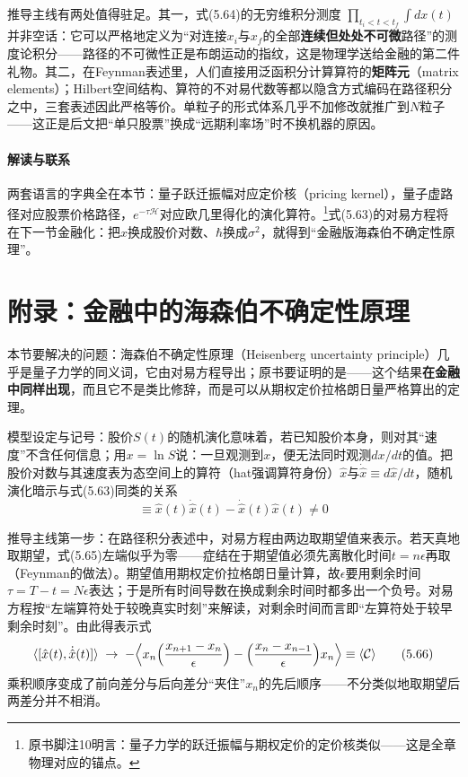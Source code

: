 推导主线有两处值得驻足。其一，式(5.64)的无穷维积分测度
$\prod_{t_i<t<t_f}\int dx(t)$并非空话：它可以严格地定义为“对连接$x_i$与$x_f$的全部\textbf{连续但处处不可微}路径”的测度论积分——路径的不可微性正是布朗运动的指纹，这是物理学送给金融的第二件礼物。其二，在Feynman表述里，人们直接用泛函积分计算算符的\textbf{矩阵元}（matrix elements）；Hilbert空间结构、算符的不对易代数等都以隐含方式编码在路径积分之中，三套表述因此严格等价。单粒子的形式体系几乎不加修改就推广到$N$粒子——这正是后文把“单只股票”换成“远期利率场”时不换机器的原因。

\paragraph{解读与联系}
两套语言的字典全在本节：量子跃迁振幅对应定价核（pricing kernel），量子虚路径对应股票价格路径，$e^{-\tau\mathcal{H}}$对应欧几里得化的演化算符。\footnote{原书脚注10明言：量子力学的跃迁振幅与期权定价的定价核类似——这是全章物理对应的锚点。}式(5.63)的对易方程将在下一节金融化：把$x$换成股价对数、$\hbar$换成$\sigma^2$，就得到“金融版海森伯不确定性原理”。

\section{附录：金融中的海森伯不确定性原理}

本节要解决的问题：海森伯不确定性原理（Heisenberg uncertainty principle）几乎是量子力学的同义词，它由对易方程导出；原书要证明的是——这个结果\textbf{在金融中同样出现}，而且它不是类比修辞，而是可以从期权定价拉格朗日量严格算出的定理。

模型设定与记号：股价$S(t)$的随机演化意味着，若已知股价本身，则对其“速度”不含任何信息；用$x=\ln S$说：一旦观测到$x$，便无法同时观测$dx/dt$的值。把股价对数与其速度表为态空间上的算符（hat强调算符身份）$\hat{x}$与$\dot{\hat{x}}\equiv d\hat{x}/dt$，随机演化暗示与式(5.63)同类的关系
\begin{equation*}
[\hat{x}(t),\dot{\hat{x}}(t)]\equiv\hat{x}(t)\dot{\hat{x}}(t)
-\dot{\hat{x}}(t)\hat{x}(t)\neq0
\tag{5.65}
\end{equation*}

推导主线第一步：在路径积分表述中，对易方程由两边取期望值来表示。若天真地取期望，式(5.65)左端似乎为零——症结在于期望值必须先离散化时间$t=n\epsilon$再取（Feynman的做法）。期望值用期权定价拉格朗日量计算，故$\epsilon$要用剩余时间$\tau=T-t=N\epsilon$表达；于是所有时间导数在换成剩余时间时都多出一个负号。对易方程按“左端算符处于较晚真实时刻”来解读，对剩余时间而言即“左算符处于较早剩余时刻”。由此得表示式
\begin{equation*}
\langle[\hat{x}(t),\dot{\hat{x}}(t)]\rangle\;\to\;
-\Bigl\langle x_n\Bigl(\frac{x_{n+1}-x_n}{\epsilon}\Bigr)
-\Bigl(\frac{x_n-x_{n-1}}{\epsilon}\Bigr)x_n\Bigr\rangle\equiv\langle\mathcal{C}\rangle
\tag{5.66}
\end{equation*}
乘积顺序变成了前向差分与后向差分“夹住”$x_n$的先后顺序——不分类似地取期望后两差分并不相消。

